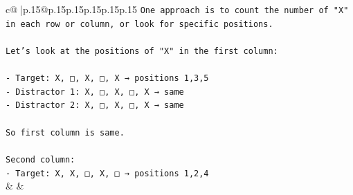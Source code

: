 \documentclass{article}
\begin{document}
{\begin{supertabular}{c@{$\;$}|p{.15\linewidth}@{}p{.15\linewidth}p{.15\linewidth}p{.15\linewidth}p{.15\linewidth}p{.15\linewidth}}
{{{\texttt{One approach is to count the number of "X" in each row or column, or look for specific positions.} \\
\\ 
\texttt{Let’s look at the positions of "X" in the first column:} \\
\\ 
\texttt{{-} Target: X, □, X, □, X → positions 1,3,5} \\
\texttt{{-} Distractor 1: X, □, X, □, X → same} \\
\texttt{{-} Distractor 2: X, □, X, □, X → same} \\
\\ 
\texttt{So first column is same.} \\
\\ 
\texttt{Second column:} \\
\texttt{{-} Target: X, X, □, X, □ → positions 1,2,4} \\
            }
        }
    }
    & & \\ \\


\end{supertabular}}
\end{document}
